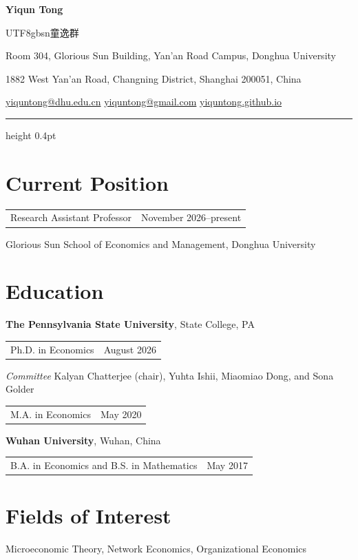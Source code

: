 \documentclass[12pt,letterpaper]{article}
\makeatletter
\newcommand{\datedentry}[2]{%
  \begin{tabularx}{\linewidth}{@{}>{\raggedright\arraybackslash}X@{\hspace{1em}}r@{}}
    #1 & #2
  \end{tabularx}\par
}
\makeatother
\begin{document}
\thispagestyle{firstpage}

{\fontsize{25}{29}\selectfont\bfseries Yiqun Tong}\quad
{\fontsize{18}{22}\selectfont\begin{CJK*}{UTF8}{gbsn}童逸群\end{CJK*}}\par
\vspace{5pt}
{\small
Room 304, Glorious Sun Building, Yan'an Road Campus, Donghua University\par
1882 West Yan'an Road, Changning District, Shanghai 200051, China\par
\vspace{2pt}
\href{mailto:yiquntong@dhu.edu.cn}{yiquntong@dhu.edu.cn}
\quad\textbar\quad
\href{mailto:yiquntong@gmail.com}{yiquntong@gmail.com}
\quad\textbar\quad
\href{https://yiquntong.github.io/}{yiquntong.github.io}\par}
\vspace{5pt}
{\hrule height 0.4pt}

\section{Current Position}
\datedentry{Research Assistant Professor}{November 2026--present}
Glorious Sun School of Economics and Management, Donghua University

\section{Education}
\textbf{The Pennsylvania State University}, State College, PA\par
\datedentry{\hspace*{1.25em}Ph.D. in Economics}{August 2026}
{\small\hspace*{2.5em}\textit{Committee}\enspace
Kalyan Chatterjee (chair), Yuhta Ishii, Miaomiao Dong, and Sona Golder\par}
\datedentry{\hspace*{1.25em}M.A. in Economics}{May 2020}
\vspace{4pt}
\textbf{Wuhan University}, Wuhan, China\par
\datedentry{\hspace*{1.25em}B.A. in Economics and B.S. in Mathematics}{May 2017}

\section{Fields of Interest}
Microeconomic Theory, Network Economics, Organizational Economics
\end{document}
